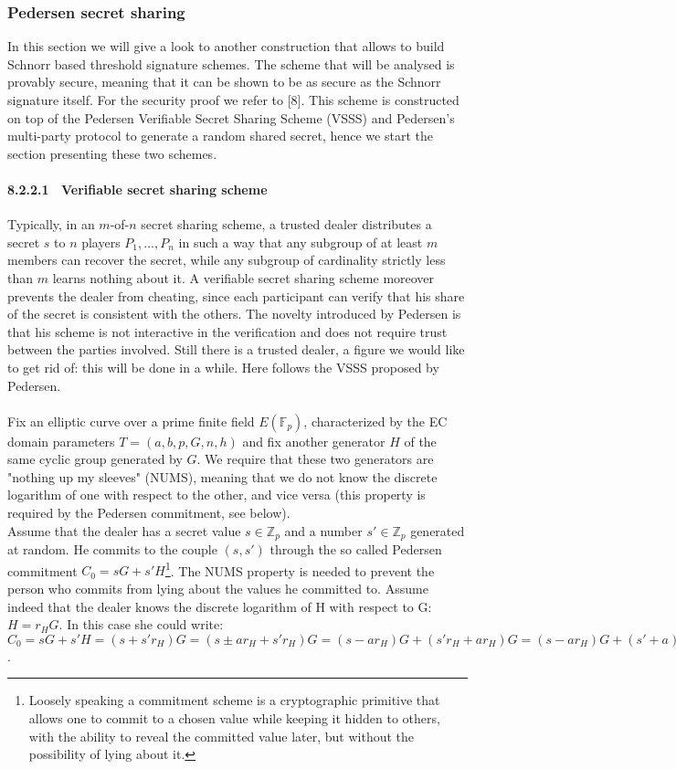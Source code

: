 \subsubsection{Pedersen secret sharing}
In this section we will give a look to another construction that allows to build Schnorr based threshold signature schemes. The scheme that will be analysed is provably secure, meaning that it can be shown to be as secure as the Schnorr signature itself. For the security proof we refer to [8]. This scheme is constructed on top of the Pedersen Verifiable Secret Sharing Scheme (VSSS) and Pedersen's multi-party protocol to generate a random shared secret, hence we start the section presenting these two schemes.

\paragraph{8.2.2.1 \ Verifiable secret sharing scheme}
Typically, in an $m$-of-$n$ secret sharing scheme, a trusted dealer distributes a secret $s$ to $n$ players $P_1, ..., P_n$ in such a way that any subgroup of at least $m$ members can recover the secret, while any subgroup of cardinality strictly less than $m$ learns nothing about it. A verifiable secret sharing scheme moreover prevents the dealer from cheating, since each participant can verify that his share of the secret is consistent with the others. The novelty introduced by Pedersen is that his scheme is not interactive in the verification and does not require trust between the parties involved. Still there is a trusted dealer, a figure we would like to get rid of: this will be done in a while. Here follows the VSSS proposed by Pedersen.
\\
\\
Fix an elliptic curve over a prime finite field $E(\mathbb{F}_p)$, characterized by the EC domain parameters $T = (a, b, p, G, n, h)$ and fix another generator $H$ of the same cyclic group generated by $G$. We require that these two generators are "nothing up my sleeves" (NUMS), meaning that we do not know the discrete logarithm of one with respect to the other, and vice versa (this property is required by the Pedersen commitment, see below).
\\
Assume that the dealer has a secret value $s \in \mathbb{Z}_p$ and a number $s' \in \mathbb{Z}_p$ generated at random. He commits to the couple $(s, s')$ through the so called Pedersen commitment $C_0 = sG + s'H$\footnote{Loosely speaking a commitment scheme is a cryptographic primitive that allows one to commit to a chosen value while keeping it hidden to others, with the ability to reveal the committed value later, but without the possibility of lying about it.}. The NUMS property is needed to prevent the person who commits from lying about the values he committed to. Assume indeed that the dealer knows the discrete logarithm of H with respect to G: $H = r_HG$. In this case she could write: $C_0 = sG + s'H = (s + s'r_H)G = (s \pm ar_H + s'r_H)G = (s - ar_H)G + (s'r_H + ar_H)G = (s - ar_H)G + (s' + a)H, \ \forall a \in \mathbb{Z}_n$.
